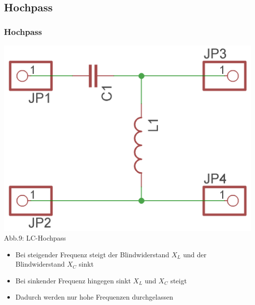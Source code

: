\subsection*{Hochpass}
\begin{frame}
  \frametitle{Hochpass}
  \begin{center}
    \includegraphics[width=\textwidth,height=.5\textheight,keepaspectratio]{e07/LC-Hochpass.png}\\
    Abb.9: LC-Hochpass
  \end{center}
  \begin{itemize}
    \item Bei steigender Frequenz steigt der Blindwiderstand $X_L$ und der Blindwiderstand $X_C$ sinkt
    \item Bei sinkender Frequenz hingegen sinkt $X_L$ und $X_C$ steigt
    \item Dadurch werden nur hohe Frequenzen durchgelassen
  \end{itemize}
\end{frame}

